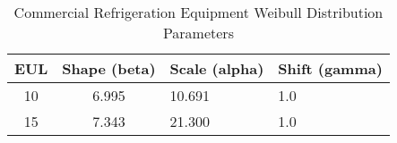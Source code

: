 \begin{table}[ht!]
\small
\centering
\caption[Commercial Refrigeration Equipment Weibull Distribution Parameters]{Commercial Refrigeration Equipment Weibull Distribution Parameters}
\label{tab:refrigeration_eul_distributions}
\begin{tabular}{|c|c|l|l|}
\hline
\textbf{EUL} & \textbf{Shape (beta)} & \textbf{Scale (alpha)} & \textbf{Shift (gamma)} \\ \hline
10  & 6.995 & 10.691 & 1.0 \\ \hline
15  & 7.343 & 21.300 & 1.0 \\ \hline
\end{tabular}
\end{table}

